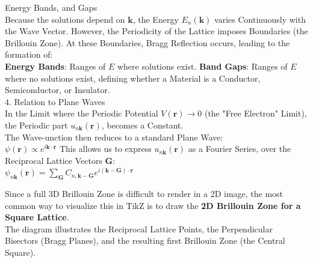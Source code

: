\documentclass[a4paper, 10pt, onepage]{elegantbook}
\begin{document}
{     Energy Bands, and Gaps  \\

Because the solutions depend on $\mathbf{k}$, the Energy $E_n(\mathbf{k})$ varies Continuously with the Wave Vector. However, the Periodicity of the Lattice imposes Boundaries (the Brillouin Zone). At these Boundaries, Bragg Reflection occurs, leading to the formation of:  \\
  \textbf{Energy Bands}: Ranges of $E$ where solutions exist.
  \textbf{Band Gaps}: Ranges of $E$ where no solutions exist, defining whether a Material is a Conductor, Semiconductor, or Insulator.  \\

    4. Relation to Plane Waves  \\

In the Limit where the Periodic Potential $V(\mathbf{r}) \to 0$ (the "Free Electron" Limit), the Periodic part $u_{n\mathbf{k}}(\mathbf{r})$, becomes a Constant.  \\ 
The Wave-unction then reduces to a standard Plane Wave:  \\
$\psi(\mathbf{r}) \propto e^{i\mathbf{k} \cdot \mathbf{r}} $
This allows us to express $u_{n\mathbf{k}}(\mathbf{r})$ as a Fourier Series, over the Reciprocal Lattice Vectors $\mathbf{G}$:  \\
$\psi_{n\mathbf{k}}(\mathbf{r}) = \sum_{\mathbf{G}} C_{n, \mathbf{k}-\mathbf{G}} e^{i(\mathbf{k}-\mathbf{G}) \cdot \mathbf{r}}$

Since a full 3D Brillouin Zone is difficult to render in a 2D image, the most common way to visualize this in TikZ is to draw the \textbf{2D Brillouin Zone for a Square Lattice}.  \\ 

The diagram illustrates the Reciprocal Lattice Points, the Perpendicular Bisectors (Bragg Planes), and the resulting first Brillouin Zone (the Central Square).

}
\end{document}
